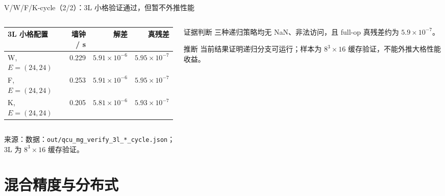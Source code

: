 \documentclass[UTF8,aspectratio=169,11pt]{ctexbeamer}
\newcommand{\source}[1]{%
  \vspace{0.06em}\par{\raggedright\scriptsize\color{muted}来源：#1\par}}
\newcommand{\code}[1]{\nolinkurl{#1}}
\newcommand{\inferred}{\textcolor{accent}{推断}}
\begin{document}
\begin{frame}[t]{V/W/F/K-cycle（2/2）：3L 小格验证通过，但暂不外推性能}
  \begin{columns}[T,totalwidth=\textwidth]
    \begin{column}{0.60\textwidth}
      \begin{center}
        \footnotesize
        \begin{tabular}{@{}lrrr@{}}
          \toprule
          3L 小格配置 & 墙钟 / s & 解差 & 真残差 \\
          \midrule
          W, $E=(24,24)$ & 0.229 & $5.91\times10^{-6}$ & $5.95\times10^{-7}$ \\
          F, $E=(24,24)$ & 0.253 & $5.91\times10^{-6}$ & $5.95\times10^{-7}$ \\
          K, $E=(24,24)$ & 0.205 & $5.81\times10^{-6}$ & $5.93\times10^{-7}$ \\
          \bottomrule
        \end{tabular}
      \end{center}
    \end{column}
    \begin{column}{0.34\textwidth}
      \begin{block}{证据判断}
        \footnotesize
        三种递归策略均无 NaN、非法访问，且 full-op 真残差约为
        $5.9\times10^{-7}$。
        \par\vspace{0.2em}
        \inferred{} 当前结果证明递归分支可运行；样本为
        $8^3\times16$ 缓存验证，不能外推大格性能收益。
      \end{block}
    \end{column}
  \end{columns}
  \source{数据：\code{out/qcu_mg_verify_3l_*_cycle.json}；\\
    3L 为 $8^3\times16$ 缓存验证。}
\end{frame}

\section{混合精度与分布式}
\end{document}

